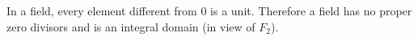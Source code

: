 In a field, every element different from $0$ is a unit. Therefore a field has no proper zero divisors and is an integral domain (in view of $F_2$).
